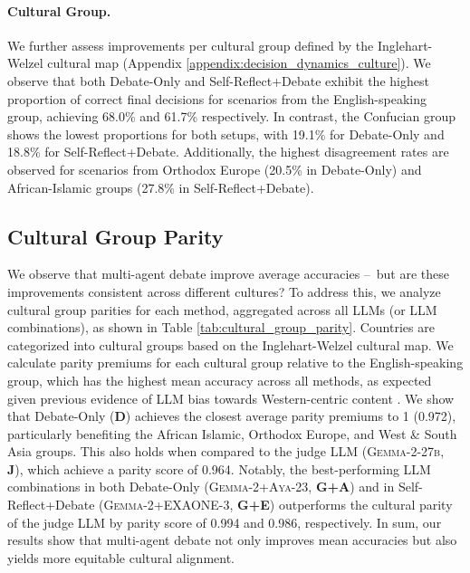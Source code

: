 \paragraph{Cultural Group.}
We further assess improvements per cultural group defined by the Inglehart-Welzel cultural map (Appendix \ref{appendix:decision_dynamics_culture}). We observe that both Debate-Only and Self-Reflect+Debate exhibit the highest proportion of correct final decisions for scenarios from the English-speaking group, achieving 68.0\% and 61.7\% respectively. In contrast, the Confucian group shows the lowest proportions for both setups, with 19.1\% for Debate-Only and 18.8\% for Self-Reflect+Debate. Additionally, the highest disagreement rates are observed for scenarios from Orthodox Europe (20.5\% in Debate-Only) and African-Islamic groups (27.8\% in Self-Reflect+Debate).


\subsection{Cultural Group Parity}
\label{sec:cultural_group_parity}
We observe that multi-agent debate improve average accuracies \---\ but are these improvements consistent across different cultures? To address this, we analyze cultural group parities for each method, aggregated across all LLMs (or LLM combinations), as shown in Table \ref{tab:cultural_group_parity}. Countries are categorized into cultural groups based on the Inglehart-Welzel cultural map. We calculate parity premiums for each cultural group relative to the English-speaking group, which has the highest mean accuracy across all methods, as expected given previous evidence of LLM bias towards Western-centric content \cite{normad, naous-etal-2024-beer}. We show that Debate-Only (\textbf{D}) achieves the closest average parity premiums to 1 (0.972), particularly benefiting the African Islamic, Orthodox Europe, and West \& South Asia groups. This also holds when compared to the judge LLM (\textsc{Gemma-2-27b}, \textbf{J}), which achieve a parity score of 0.964. Notably, the best-performing LLM combinations in both Debate-Only (\textsc{Gemma-2}+\textsc{Aya-23}, \textbf{G+A}) and in Self-Reflect+Debate (\textsc{Gemma-2}+\textsc{EXAONE-3}, \textbf{G+E}) outperforms the cultural parity of the judge LLM by parity score of 0.994 and 0.986, respectively. 
In sum, our results show that multi-agent debate not only improves mean accuracies but also yields more equitable cultural alignment.%


